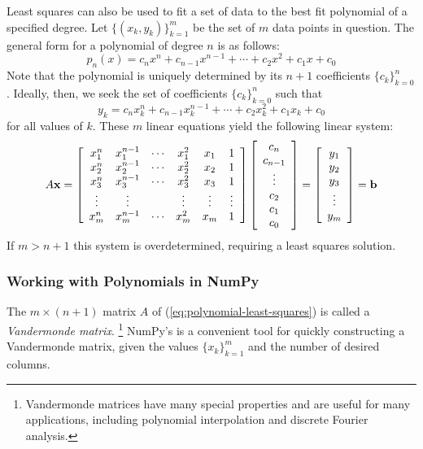 Least squares can also be used to fit a set of data to the best fit polynomial of a specified degree.
Let $\{(x_k, y_k)\}_{k=1}^m$ be the set of $m$ data points in question.
The general form for a polynomial of degree $n$ is as follows:
\[
p_n(x) = c_n x^n + c_{n-1} x^{n-1} + \cdots + c_2 x^2 + c_1 x + c_0
\]
Note that the polynomial is uniquely determined by its $n+1$ coefficients $\{c_k\}_{k=0}^n$.
Ideally, then, we seek the set of coefficients $\{c_k\}_{k=0}^n$ such that
\[
y_k = c_n x_k^n + c_{n-1} x_k^{n-1} + \cdots + c_2 x_k^2 + c_1 x_k + c_0
\]
for all values of $k$.
These $m$ linear equations yield the following linear system:
\begin{equation}
A\mathbf{x} =
\left[\begin{array}{cccccc}
x_1^n & x_1^{n-1} & \cdots & x_1^2 & x_1 & 1 \\
x_2^n & x_2^{n-1} & \cdots & x_2^2 & x_2 & 1 \\
x_3^n & x_3^{n-1} & \cdots & x_3^2 & x_3 & 1 \\
\vdots & \vdots & & \vdots & \vdots & \vdots \\
x_m^n & x_m^{n-1} & \cdots & x_m^2 & x_m & 1 \\
\end{array}\right]
\left[\begin{array}{c}
c_n \\ c_{n-1} \\ \vdots \\ c_2 \\ c_1 \\ c_0
\end{array}\right]
=
\left[\begin{array}{c} y_1 \\ y_2 \\ y_3 \\ \vdots \\ y_m \end{array}\right]
= \mathbf{b}
\label{eq:polynomial-least-squares}
\end{equation}
%
If $m > n+1$ this system is overdetermined, requiring a least squares solution.

\subsubsection*{Working with Polynomials in NumPy} %

The $m \times (n+1)$ matrix $A$ of (\ref{eq:polynomial-least-squares}) is called a \emph{Vandermonde matrix}.%
\footnote{Vandermonde matrices have many special properties and are useful for many applications, including polynomial interpolation and discrete Fourier analysis.}
NumPy's  is a convenient tool for quickly constructing a Vandermonde matrix, given the values $\{x_k\}_{k=1}^m$ and the number of desired columns.

